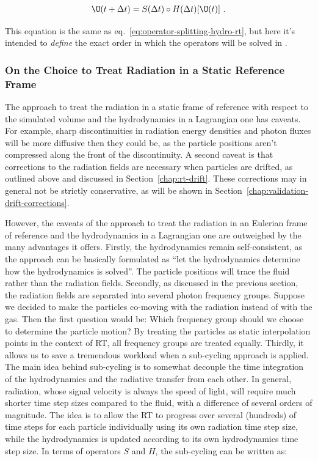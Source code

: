 \begin{align}
    \U(t + \Delta t) = S(\Delta t) \circ H(\Delta t) [ \U (t)] \ .
\end{align}

This equation is the same as eq.~\ref{eq:operator-splitting-hydro-rt}, but here it's intended to
\emph{define} the exact order in which the operators will be solved in \GEARRT.








\subsubsection{On the Choice to Treat Radiation in a Static Reference Frame}


The approach to treat the radiation in a static frame of reference with respect to the simulated
volume and the hydrodynamics in a Lagrangian one has caveats. For example, sharp discontinuities in
radiation energy densities and photon fluxes will be more diffusive then they could be, as the
particle positions aren't compressed along the front of the discontinuity. A second caveat is that
corrections to the radiation fields are necessary when particles are drifted, as outlined above and
discussed in Section~\ref{chap:rt-drift}. These corrections may in general not be strictly
conservative, as will be shown in Section~\ref{chap:validation-drift-corrections}.

However, the caveats of the approach to treat the radiation in an Eulerian frame of reference and
the hydrodynamics in a Lagrangian one are outweighed by the many advantages it offers. Firstly, the
hydrodynamics remain self-consistent, as the approach can be basically formulated as ``let the
hydrodynamics determine how the hydrodynamics is solved''. The particle positions will trace the
fluid rather than the radiation fields. Secondly, as discussed in the previous section, the
radiation fields are separated into several photon frequency groups. Suppose we decided to make the
particles co-moving with the radiation instead of with the gas. Then the first question would be:
Which frequency group should we choose to determine the particle motion? By treating the particles
as static interpolation points in the context of RT, all frequency groups are treated equally.
Thirdly, it allows us to save a tremendous workload when a sub-cycling approach is applied. The main
idea behind sub-cycling is to somewhat decouple the time integration of the hydrodynamics and the
radiative transfer from each other. In general, radiation, whose signal velocity is always the speed
of light, will require much shorter time step sizes compared to the fluid, with a difference of
several orders of magnitude. The idea is to allow the RT to progress over several (hundreds) of time
steps for each particle individually using its own radiation time step size, while the hydrodynamics
is updated according to its own hydrodynamics time step size. In terms of operators $S$ and $H$, the
sub-cycling can be written as:

